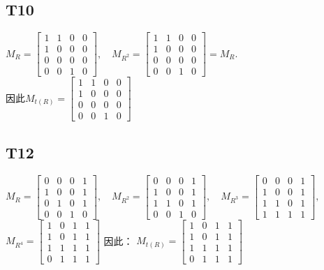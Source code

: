 \documentclass{article}
\begin{document}
\subsection{T10}
$M_R = 
\begin{bmatrix}
    1 & 1 & 0 & 0\\
    1 & 0 & 0 & 0\\
    0 & 0 & 0 & 0\\
    0 & 0 & 1 & 0
\end{bmatrix},\quad 
M_{R^2} = 
\begin{bmatrix}
    1 & 1 & 0 & 0\\
    1 & 0 & 0 & 0\\
    0 & 0 & 0 & 0\\
    0 & 0 & 1 & 0
\end{bmatrix} = M_R$.\\
因此$M_{t(R)} = 
\begin{bmatrix}
    1 & 1 & 0 & 0\\
    1 & 0 & 0 & 0\\
    0 & 0 & 0 & 0\\
    0 & 0 & 1 & 0
\end{bmatrix}$
\subsection{T12}
$M_R = 
\begin{bmatrix}
    0 & 0 & 0 & 1\\
    1 & 0 & 0 & 1\\
    0 & 1 & 0 & 1\\
    0 & 0 & 1 & 0
\end{bmatrix}, \quad
M_{R^2} = 
\begin{bmatrix}
    0 & 0 & 0 & 1\\
    1 & 0 & 0 & 1\\
    1 & 1 & 0 & 1\\
    0 & 0 & 1 & 0
\end{bmatrix}, \quad
M_{R^3} = 
\begin{bmatrix}
    0 & 0 & 0 & 1\\
    1 & 0 & 0 & 1\\
    1 & 1 & 0 & 1\\
    1 & 1 & 1 & 1
\end{bmatrix},$\\
$M_{R^4} = 
\begin{bmatrix}
    1 & 0 & 1 & 1\\
    1 & 0 & 1 & 1\\
    1 & 1 & 1 & 1\\
    0 & 1 & 1 & 1
\end{bmatrix}$
因此：
$M_{t(R)} = 
\begin{bmatrix}
    1 & 0 & 1 & 1\\
    1 & 0 & 1 & 1\\
    1 & 1 & 1 & 1\\
    0 & 1 & 1 & 1
\end{bmatrix}$
\end{document}
